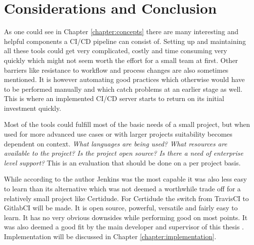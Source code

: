 \section{Considerations and Conclusion}
As one could see in Chapter \ref{chapter:concepts} there are many interesting and helpful components a CI/CD pipeline can consist of. Setting up and maintaining all these tools could get very complicated, costly and time consuming very quickly which might not seem worth the effort for a small team at first.\cite{cicd-review} Other barriers like resistance to workflow and process changes are also sometimes mentioned.\cite{comparison-cicd} It is however automating good practices which otherwise would have to be performed manually and which catch problems at an earlier stage as well. This is where an implemented CI/CD server starts to return on its initial investment quickly.\cite{comparison-cicd}

Most of the tools could fulfill most of the basic needs of a small project, but when used for more advanced use cases or with larger projects suitability becomes dependent on context. \textit{What languages are being used? What resources are available to the project? Is the project open source? Is there a need of enterprise level support?} This is an evaluation that should be done on a per project basis.

While according to the author Jenkins was the most capable it was also less easy to learn than its alternative which was not deemed a worthwhile trade off for a relatively small project like Certidude. For Certidude the switch from TravisCI to GitlabCI will be made. It is open source, powerful, versatile and fairly easy to learn. It has no very obvious downsides while performing good on most points. It was also deemed a good fit by the main developer and supervisor of this thesis \supervisor. Implementation will be discussed in Chapter \ref{chapter:implementation}.